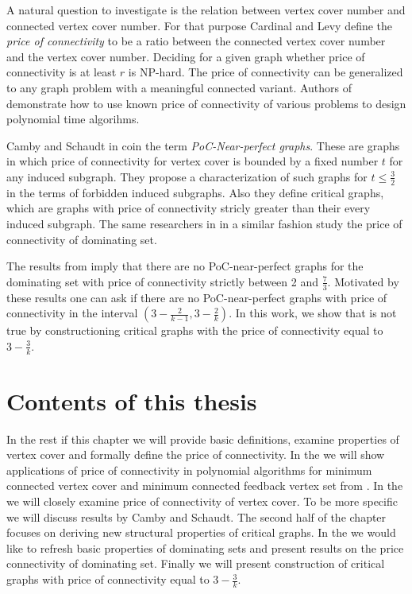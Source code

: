 A natural question to investigate is the relation between vertex cover number and connected vertex cover number.
For that purpose Cardinal and Levy define the \emph{price of connectivity} to be a ratio between the connected vertex cover number and the vertex cover number.
Deciding for a given graph whether price of connectivity is at least \(r\) is NP-hard.
The price of connectivity can be generalized to any graph problem with a meaningful connected variant.
Authors of \cite{ChiarelliHartinger18} demonstrate how to use known price of connectivity of various problems to design polynomial time algorihms.

Camby and Schaudt in \cite{CambyCardinalFioriniSchaudt14} coin the term \emph{PoC-Near-perfect graphs}.
These are graphs in which price of connectivity for vertex cover is bounded by a fixed number \(t\) for any induced subgraph.
They propose a characterization of such graphs for \(t \leq \frac{3}{2}\) in the terms of forbidden induced subgraphs.
Also they define critical graphs, which are graphs with price of connectivity stricly greater than their every induced subgraph.
The same researchers in \cite{CambySchaudt14} in a similar fashion study the price of connectivity of dominating set.

The results from \cite{Bonamy18} imply that there are no PoC-near-perfect graphs for the dominating set with price of connectivity strictly between
2 and \(\frac{7}{3}\). 
Motivated by these results one can ask if there are no PoC-near-perfect graphs with price of connectivity in the interval \((3 -\frac{2}{k-1}, 3-\frac{2}{k})\).
In this work, we show that is not true by constructioning critical graphs with the price of connectivity equal to \(3 - \frac{3}{k}\).

\section{Contents of this thesis}
In the rest if this chapter we will provide basic definitions, examine properties of vertex cover and formally define the price of connectivity.
In the  we will show applications of price of connectivity in polynomial algorithms for minimum connected vertex cover and minimum 
connected feedback vertex set from \cite{ChiarelliHartinger18}.
In the  we will closely examine price of connectivity of vertex cover. To be more specific we will discuss results by Camby and Schaudt. 
The second half of the chapter focuses on deriving new structural properties of critical graphs.
In the  we would like to refresh basic properties 
of dominating sets and present results on the price connectivity of dominating set.
Finally we will present construction of critical graphs with price of connectivity
equal to \(3 - \frac{3}{k}\).

